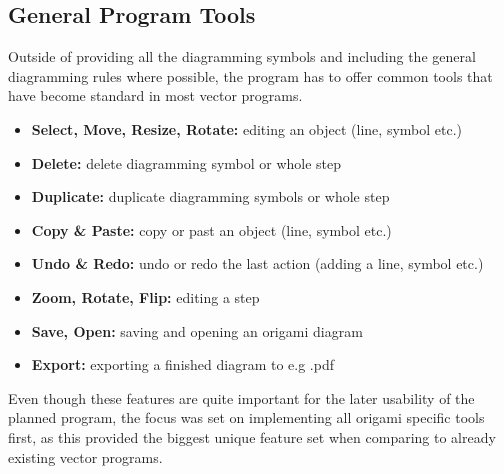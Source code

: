 \subsection{General Program Tools}
\label{sec:generalProgramTools}

Outside of providing all the diagramming symbols and including the general diagramming rules where possible, the program has to offer common tools that have become standard in most vector programs.
\begin{itemize}
	\item \textbf{Select, Move, Resize, Rotate:} editing an object (line, symbol etc.)
	\item \textbf{Delete:} delete diagramming symbol or whole step
	\item \textbf{Duplicate:} duplicate diagramming symbols or whole step
	\item \textbf{Copy \& Paste:} copy or past an object (line, symbol etc.)
	\item \textbf{Undo \& Redo:} undo or redo the last action (adding a line, symbol etc.)
	\item \textbf{Zoom, Rotate, Flip:} editing a step
	\item \textbf{Save, Open:} saving and opening an origami diagram
	\item \textbf{Export:} exporting a finished diagram to e.g .pdf
\end{itemize}
Even though these features are quite important for the later usability of the planned program, the focus was set on implementing all origami specific tools first, as this provided the biggest unique feature set when comparing to already existing vector programs.